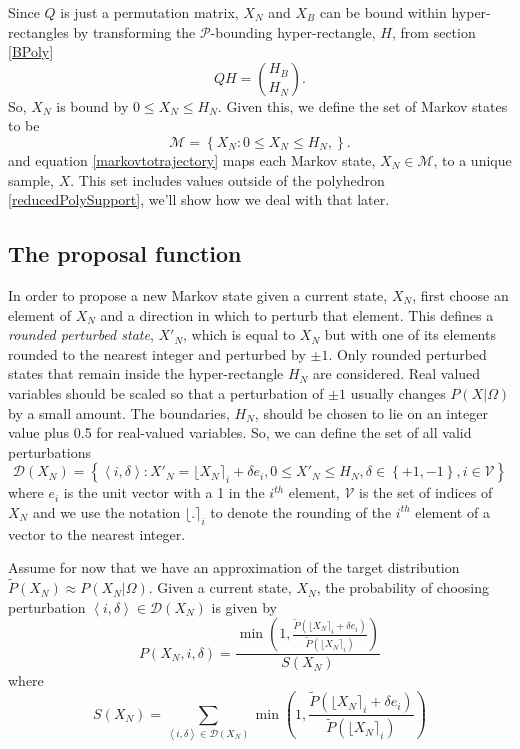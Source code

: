 \documentclass{article}
\begin{document}
Since $Q$ is just a permutation matrix, $X_N$ and $X_B$ can be bound within hyper-rectangles by transforming the $\mathcal{P}$-bounding hyper-rectangle, $H$, from section \ref{BPoly}
\[
QH = {H_B \choose H_N}.
\]
So, $X_N$ is bound by $0 \le X_N \le H_N$. Given this, we define the set of Markov states to be
\[
\mathcal{M} = \left\{ X_N: 0 \le X_N \le H_N, \right\}.
\]
and equation \eqref{markovtotrajectory} maps each Markov state, $X_N \in \mathcal{M}$, to a unique sample, $X$. This set includes values outside of the polyhedron \eqref{reducedPolySupport}, we'll show how we deal with that later.

\subsection{The proposal function}
\label{theProposalFunction}
In order to propose a new Markov state given a current state, $X_N$, first choose an element of $X_N$ and a direction in which to perturb that element. This defines a \textit{rounded perturbed state}, $X'_N$,  which is equal to $X_N$ but with one of its elements rounded to the nearest integer and perturbed by $\pm 1$. Only rounded perturbed states that remain inside the hyper-rectangle $H_N$ are considered. Real valued variables should be scaled so that a perturbation of $\pm 1$ usually changes $P(X|\Omega)$ by a small amount. The boundaries, $H_N$, should be chosen to lie on an integer value plus 0.5 for real-valued variables. So, we can define the set of all valid perturbations
\[
\mathcal{D}(X_N) = \left\{\left<i,\delta\right> : X'_N = \lfloor X_N \rceil_i + \delta e_i, 0 \le X'_N \le H_N, \delta \in \left\{+1,-1\right\}, i \in \mathcal{V} \right\}
\]
where $e_i$ is the unit vector with a 1 in the $i^{th}$ element, $\mathcal{V}$ is the set of indices of $X_N$ and we use the notation $\lfloor . \rceil_i$ to denote the rounding of the $i^{th}$ element of a vector to the nearest integer.

Assume for now that we have an approximation of the target distribution $\tilde{P}(X_N) \approx P(X_N|\Omega)$. Given a current state, $X_N$, the probability of choosing perturbation $\left<i,\delta\right> \in \mathcal{D}(X_N)$ is given by
\begin{equation}
P(X_N,i,\delta) = \frac{\min\left(1, \frac{\tilde{P}(\lfloor X_N \rceil_i + \delta e_i)}{\tilde{P}(\lfloor X_N \rceil_i)}\right)}{S(X_N)} 
\label{transitionProb}
\end{equation}
where
\begin{equation}
S(X_N) = \sum_{\left<i,\delta\right> \in \mathcal{D}(X_N)} \min\left(1, \frac{\tilde{P}(\lfloor X_N \rceil_i + \delta e_i)}{\tilde{P}(\lfloor X_N \rceil_i)}\right)
\label{transitionSum}
\end{equation}
\end{document}
